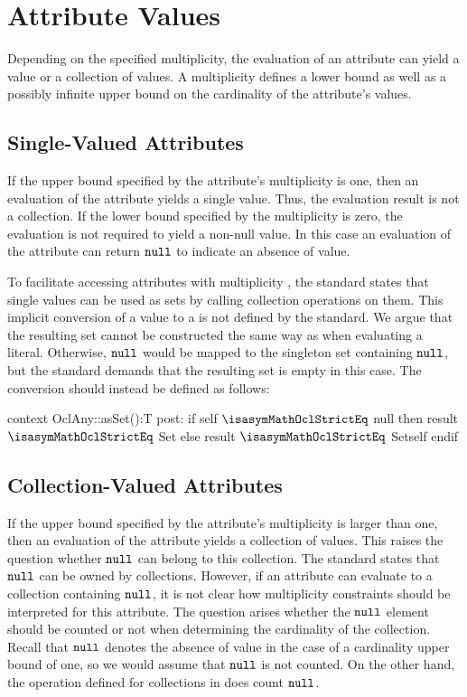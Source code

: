 \section{Attribute Values}\label{sec:multiplicities}
Depending on the specified multiplicity, the evaluation of an attribute can
yield a value or a collection of values. A multiplicity defines a lower bound as
well as a possibly infinite upper bound on the cardinality of the attribute's
values.

\subsection{Single-Valued Attributes}\label{subsec:single-valued-properties}
If the upper bound specified by the attribute's multiplicity is one, then an
evaluation of the attribute yields a single value. Thus, the evaluation result
is not a collection. If the lower bound specified by the multiplicity is zero,
the evaluation is not required to yield a non-null value. In this case an
evaluation of the attribute can return $\mathtt{null}$ to indicate an
absence of value.

To facilitate accessing attributes with multiplicity , the \OCL
standard states that single values can be used as sets by calling collection
operations on them. This implicit conversion of a value to a
 is not defined by the standard. We argue that the resulting set
cannot be constructed the same way as when evaluating a 
literal. Otherwise, $\mathtt{null}$ would be mapped to the singleton set
containing $\mathtt{null}$, but the standard demands that
the resulting set is empty in this case. The conversion should instead
be defined as follows:
\begin{ocl}
context OclAny::asSet():T
  post: if self $\isasymMathOclStrictEq$ null then result $\isasymMathOclStrictEq$ Set{}
        else result $\isasymMathOclStrictEq$ Set{self} endif
\end{ocl}

\subsection{Collection-Valued Attributes}\label{subsec:collection-valued-properties}
If the upper bound specified by the attribute's multiplicity is larger than one,
then an evaluation of the attribute yields a collection of values.  This raises
the question whether $\mathtt{null}$ can belong to this collection. The \OCL
standard states that $\mathtt{null}$ can be owned by collections. However, if
an attribute can evaluate to a collection containing $\mathtt{null}$, it is not
clear how multiplicity constraints should be interpreted for this attribute. The
question arises whether the $\mathtt{null}$ element should be counted or not
when determining the cardinality of the collection. Recall that $\mathtt{null}$
denotes the absence of value in the case of a cardinality upper bound of one, so
we would assume that $\mathtt{null}$ is not counted. On the other hand, the
operation  defined for collections in \OCL does count
$\mathtt{null}$.

